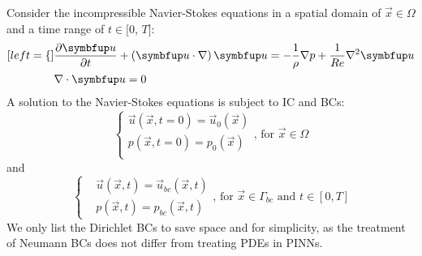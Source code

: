 Consider the incompressible Navier-Stokes equations in a spatial domain of $\vec{x}\in\Omega$ and a time range of $t\in[0$, $T]$:
\begin{subequations}\label{eq:orig-ns}
    \begin{align}[left=\empheqlbrace\,]
        &\pdiff{\vec{u}}{t} + \left(\vec{u} \cdot \nabla\right) \vec{u}
            =
            -\frac{1}{\rho}\nabla p + \frac{1}{Re} \nabla^2 \vec{u}
            \label{eq:orig-ns-momentum} \\
        &\nabla \cdot \vec{u} = 0 \label{eq:orig-ns-cont}
    \end{align}
\end{subequations}
A solution to the Navier-Stokes equations is subject to IC and BCs:
\begin{equation}\label{eq:orig-ns-ic}
    \left\{
        \begin{array}{l}
            \vec{u}(\vec{x}, t=0) = \vec{u}_0(\vec{x}) \\
            p(\vec{x}, t=0) = p_0(\vec{x}) \\
        \end{array}
    \right.
    \text{,\ \ for }
    \vec{x} \in \Omega
\end{equation}
and
\begin{equation}\label{eq:orig-ns-bc}
    \left\{
        \begin{aligned}
            &\vec{u}(\vec{x}, t) = \vec{u}_{bc}(\vec{x}, t) \\
            &p(\vec{x}, t) = p_{bc}(\vec{x}, t)
        \end{aligned}
        \text{,\ \ for }
        \vec{x} \in \Gamma_{bc}
        \text{ and }
        t \in [0, T]
    \right.
\end{equation}
We only list the Dirichlet BCs to save space and for simplicity, as the treatment of Neumann BCs does not differ from treating PDEs in PINNs.

